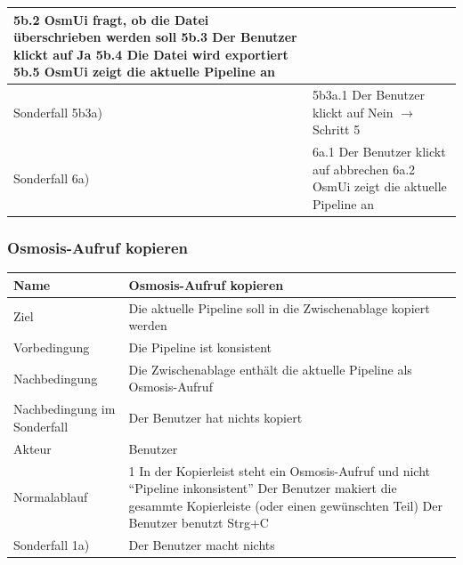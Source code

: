 \documentclass[a4paper,12pt]{scrartcl}
\begin{document}
\begin{center}
\begin{tabular}{|p{5cm}|p{10cm}|}
\newline 5b.2 OsmUi fragt, ob die Datei überschrieben werden soll
\newline 5b.3 Der Benutzer klickt auf Ja
\newline 5b.4 Die Datei wird exportiert
\newline 5b.5 OsmUi zeigt die aktuelle Pipeline an\\
\hline Sonderfall 5b3a) & 5b3a.1 Der Benutzer klickt auf Nein
\newline $ \rightarrow$ Schritt 5\\
\hline Sonderfall 6a) & 6a.1 Der Benutzer klickt auf abbrechen
\newline 6a.2 OsmUi zeigt die aktuelle Pipeline an\\
\hline 
\end{tabular}
\end{center}
\subsubsection{Osmosis-Aufruf kopieren}
\begin{center}
\begin{tabular}{|p{5cm}|p{10cm}|}
\hline Name & \textbf{Osmosis-Aufruf kopieren} \\ 
\hline Ziel & Die aktuelle Pipeline soll in die Zwischenablage kopiert werden\\ 
\hline Vorbedingung & Die Pipeline ist konsistent\\ 
\hline Nachbedingung & Die Zwischenablage enthält die aktuelle Pipeline als Osmosis-Aufruf \\  
\hline Nachbedingung im Sonderfall & Der Benutzer hat nichts kopiert \\
\hline Akteur & Benutzer \\ 
\hline Normalablauf & 1 In der Kopierleist steht ein Osmosis-Aufruf und nicht ``Pipeline inkonsistent''
\newline 2 Der Benutzer makiert die gesammte Kopierleiste (oder einen gewünschten Teil)
\newline 3 Der Benutzer benutzt Strg+C\\ 
\hline Sonderfall 1a) & Der Benutzer macht nichts\\
\hline 
\end{tabular} 
\end{center}
\end{document}
